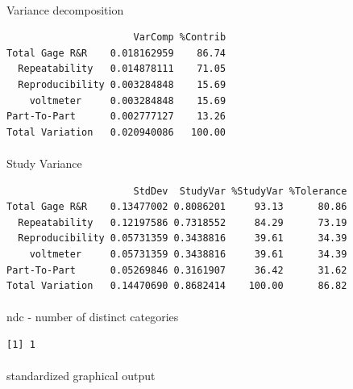 \documentclass[
  a4paper,
]{scrbook}
\makeatletter
\let\oldparagraph\paragraph
\renewcommand{\paragraph}{
    \@ifstar
      \xxxParagraphStar
      \xxxParagraphNoStar
  }
\newcommand{\xxxParagraphStar}[1]{\oldparagraph*{#1}\mbox{}}
\newcommand{\xxxParagraphNoStar}[1]{\oldparagraph{#1}\mbox{}}
\makeatother
\begin{document}
\paragraph{Variance decomposition}\label{variance-decomposition}

\begin{verbatim}
                      VarComp %Contrib
Total Gage R&R    0.018162959    86.74
  Repeatability   0.014878111    71.05
  Reproducibility 0.003284848    15.69
    voltmeter     0.003284848    15.69
Part-To-Part      0.002777127    13.26
Total Variation   0.020940086   100.00
\end{verbatim}

\paragraph{Study Variance}\label{study-variance}

\begin{verbatim}
                      StdDev  StudyVar %StudyVar %Tolerance
Total Gage R&R    0.13477002 0.8086201     93.13      80.86
  Repeatability   0.12197586 0.7318552     84.29      73.19
  Reproducibility 0.05731359 0.3438816     39.61      34.39
    voltmeter     0.05731359 0.3438816     39.61      34.39
Part-To-Part      0.05269846 0.3161907     36.42      31.62
Total Variation   0.14470690 0.8682414    100.00      86.82
\end{verbatim}

\paragraph{ndc - number of distinct
categories}\label{ndc---number-of-distinct-categories}

\begin{verbatim}
[1] 1
\end{verbatim}

\paragraph{standardized graphical
output}\label{standardized-graphical-output}
\end{document}
